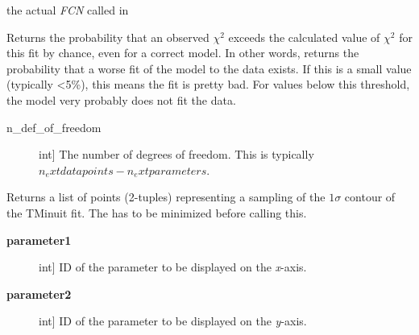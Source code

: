 \documentclass[a4paper,10pt,english]{sphinxmanual}
\begin{document}
\begin{fulllineitems}
\begin{fulllineitems}
\begin{description}
\end{description}

\end{fulllineitems}


\begin{fulllineitems}
\label{index:kafe.minuit.Minuit.function_to_minimize}
the actual \emph{FCN} called in 

\end{fulllineitems}


\begin{fulllineitems}
\label{index:kafe.minuit.Minuit.get_chi2_probability}
Returns the probability that an observed $\chi^2$ exceeds
the calculated value of $\chi^2$ for this fit by chance, even for a correct model.
In other words, returns the probability that a worse fit of the model to the data exists.
If this is a small value (typically \textless{}5\%), this means the fit is pretty bad. For
values below this threshold, the model very probably does not fit the data.
\begin{description}
\item[{n\_def\_of\_freedom}] \leavevmode{[}int{]}
The number of degrees of freedom. This is typically $n_       ext{datapoints} - n_    ext{parameters}$.

\end{description}

\end{fulllineitems}


\begin{fulllineitems}
\label{index:kafe.minuit.Minuit.get_contour}
Returns a list of points (2-tuples) representing a sampling of
the $1\sigma$ contour of the TMinuit fit. The  has to be
minimized before calling this.
\begin{description}
\item[{\textbf{parameter1}}] \leavevmode{[}int{]}
ID of the parameter to be displayed on the \emph{x}-axis.

\item[{\textbf{parameter2}}] \leavevmode{[}int{]}
ID of the parameter to be displayed on the \emph{y}-axis.


\end{description}
\end{fulllineitems}
\end{fulllineitems}
\end{document}
